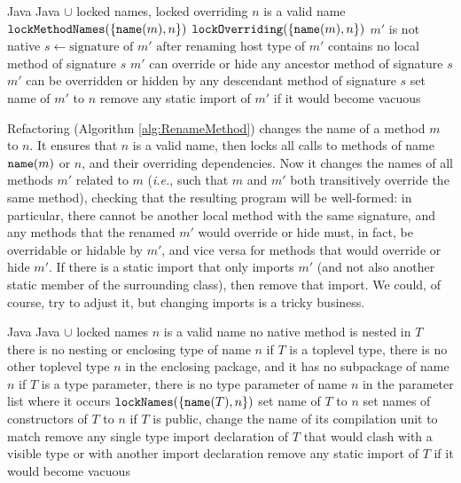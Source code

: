 \begin{algorithm}[p]
\caption{$\refactoring{Rename Method}(m : \type{Method}, n : \type{Name})$}\label{alg:RenameMethod}
\begin{algorithmic}[1]
\REQUIRE Java
\ENSURE Java $\cup$ locked names, locked overriding
\medskip
\STATE \assert $n$ is a valid name
\STATE $\text{\texttt{lockMethodNames}}(\{\text{\texttt{name}}(m), n\})$
\STATE $\text{\texttt{lockOverriding}}(\{\text{\texttt{name}}(m), n\})$
  \STATE \assert $m'$ is not native
  \STATE $s\leftarrow\text{signature of $m'$ after renaming}$
  \STATE \assert host type of $m'$ contains no local method of signature $s$
  \STATE \assert $m'$ can override or hide any ancestor method of signature $s$
  \STATE \assert $m'$ can be overridden or hidden by any descendant method of signature $s$
  \STATE set name of $m'$ to $n$
  \STATE remove any static import of $m'$ if it would become vacuous
\ENDFOR
\end{algorithmic}
\end{algorithm}

Refactoring  (Algorithm \ref{alg:RenameMethod}) changes the name of a method $m$ to $n$. It ensures that $n$ is a valid name, then locks all calls to methods of name $\text{\texttt{name}}(m)$ or $n$, and their overriding dependencies. Now it changes the names of all methods $m'$ related to $m$ (\emph{i.e.}, such that $m$ and $m'$ both transitively override the same method), checking that the resulting program will be well-formed: in particular, there cannot be another local method with the same signature, and any methods that the renamed $m'$ would override or hide must, in fact, be overridable or hidable by $m'$, and vice versa for methods that would override or hide $m'$. If there is a static import that only imports $m'$ (and not also another static member of the surrounding class), then remove that import. We could, of course, try to adjust it, but changing imports is a tricky business.

\begin{algorithm}[p]
\caption{$\refactoring{Rename Type}(T : \type{Type}, n : \type{Name})$}\label{alg:RenameType}
\begin{algorithmic}[1]
\REQUIRE Java
\ENSURE Java $\cup$ locked names
\medskip
\STATE \assert $n$ is a valid name
\STATE \assert no native method is nested in $T$
\STATE \assert there is no nesting or enclosing type of name $n$
\STATE \assert if $T$ is a toplevel type, there is no other toplevel type $n$ in the enclosing package, and it has no subpackage of name $n$
\STATE \assert if $T$ is a type parameter, there is no type parameter of name $n$ in the parameter list where it occurs
\STATE $\text{\texttt{lockNames}}(\{\text{\texttt{name}}(T), n\})$
\STATE set name of $T$ to $n$
\STATE set names of constructors of $T$ to $n$
\STATE if $T$ is public, change the name of its compilation unit to match
\STATE remove any single type import declaration of $T$ that would clash with a visible type or with another import declaration
\STATE remove any static import of $T$ if it would become vacuous
\end{algorithmic}
\end{algorithm}

